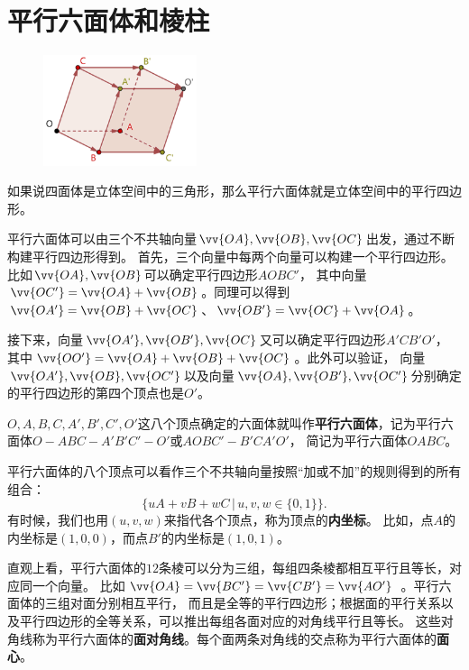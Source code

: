 \documentclass[12pt,UTF8]{ctexbook}
\begin{document}
\section{平行六面体和棱柱}

\begin{figure} %
    \vspace{-40pt}
    \flushright
    \includegraphics[width=0.4\textwidth]{平行六面体1.png}
\end{figure}

如果说四面体是立体空间中的三角形，那么平行六面体就是立体空间中的平行四边形。

平行六面体可以由三个不共轴向量$\vv{OA},\vv{OB},\vv{OC}$出发，通过不断构建平行四边形得到。
首先，三个向量中每两个向量可以构建一个平行四边形。比如$\vv{OA},\vv{OB}$可以确定平行四边形$AOBC'$，
其中向量$\vv{OC'}=\vv{OA}+\vv{OB}$。同理可以得到$\vv{OA'}=\vv{OB}+\vv{OC}$、$\vv{OB'}=\vv{OC}+\vv{OA}$。

接下来，向量$\vv{OA'},\vv{OB'},\vv{OC}$又可以确定平行四边形$A'CB'O'$，
其中$\vv{OO'}=\vv{OA}+\vv{OB}+\vv{OC}$。此外可以验证，
向量$\vv{OA'},\vv{OB},\vv{OC'}$以及向量$\vv{OA},\vv{OB'},\vv{OC'}$分别确定的平行四边形的第四个顶点也是$O'$。

$O,A,B,C,A',B',C',O'$这八个顶点确定的六面体就叫作\textbf{平行六面体}，记为平行六面体$O-ABC-A'B'C'-O'$或$AOBC'-B'CA'O'$，
简记为平行六面体$OABC$。

平行六面体的八个顶点可以看作三个不共轴向量按照“加或不加”的规则得到的所有组合：
$$ \big\{uA+vB+wC \, | \, u,v,w\in\{0,1\}\big\}.$$
有时候，我们也用$(u,v,w)$来指代各个顶点，称为顶点的\textbf{内坐标}。
比如，点$A$的内坐标是$(1,0,0)$，而点$B'$的内坐标是$(1,0,1)$。

直观上看，平行六面体的$12$条棱可以分为三组，每组四条棱都相互平行且等长，对应同一个向量。
比如$\vv{OA} = \vv{BC'} = \vv{CB'} = \vv{AO'}$ 。平行六面体的三组对面分别相互平行，
而且是全等的平行四边形；根据面的平行关系以及平行四边形的全等关系，可以推出每组各面对应的对角线平行且等长。
这些对角线称为平行六面体的\textbf{面对角线}。每个面两条对角线的交点称为平行六面体的\textbf{面心}。
\end{document}
